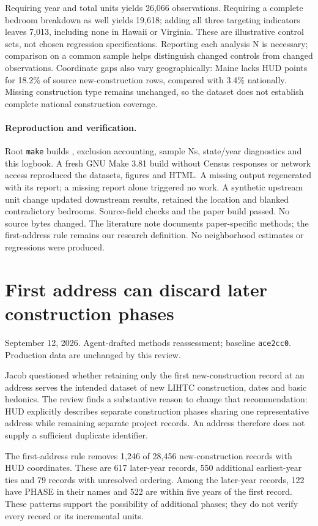 \documentclass[11pt]{article}
\begin{document}
Requiring year and total units yields 26,066 observations. Requiring a complete
bedroom breakdown as well yields 19,618; adding all three targeting indicators
leaves 7,013, including none in Hawaii or Virginia. These are illustrative control
sets, not chosen regression specifications. Reporting each analysis N is necessary;
comparison on a common sample helps distinguish changed controls from changed
observations. Coordinate gaps also vary geographically: Maine lacks HUD points
for 18.2\% of source new-construction rows, compared with 3.4\% nationally.
Missing construction type remains unchanged, so the dataset does not establish
complete national construction coverage.

\paragraph{Reproduction and verification.} Root \texttt{make} builds
, exclusion accounting, sample Ns,
state/year diagnostics and this logbook. A fresh GNU Make 3.81 build without
Census responses or network access reproduced the datasets, figures and HTML.
A missing output regenerated with its report; a missing report alone triggered
no work. A synthetic upstream unit change updated downstream results, retained
the location and blanked contradictory bedrooms. Source-field checks and the
paper build passed. No source bytes changed. The literature note documents
paper-specific methods; the first-address rule remains our research definition.
No neighborhood estimates or regressions were produced.
\clearpage
\section*{First address can discard later construction phases}
\noindent September 12, 2026. Agent-drafted methods reassessment; baseline
\texttt{ace2cc0}. Production data are unchanged by this review.

Jacob questioned whether retaining only the first new-construction record at an
address serves the intended dataset of new LIHTC construction, dates and basic
hedonics. The review finds a substantive reason to change that recommendation:
HUD explicitly describes separate construction phases sharing one representative
address while remaining separate project records. An address therefore does not
supply a sufficient duplicate identifier.

The first-address rule removes 1,246 of 28,456 new-construction records with HUD
coordinates. These are 617 later-year records, 550 additional earliest-year ties
and 79 records with unresolved ordering. Among the later-year records, 122 have
PHASE in their names and 522 are within five years of the first record. These
patterns support the possibility of additional phases; they do not verify every
record or its incremental units.
\end{document}
